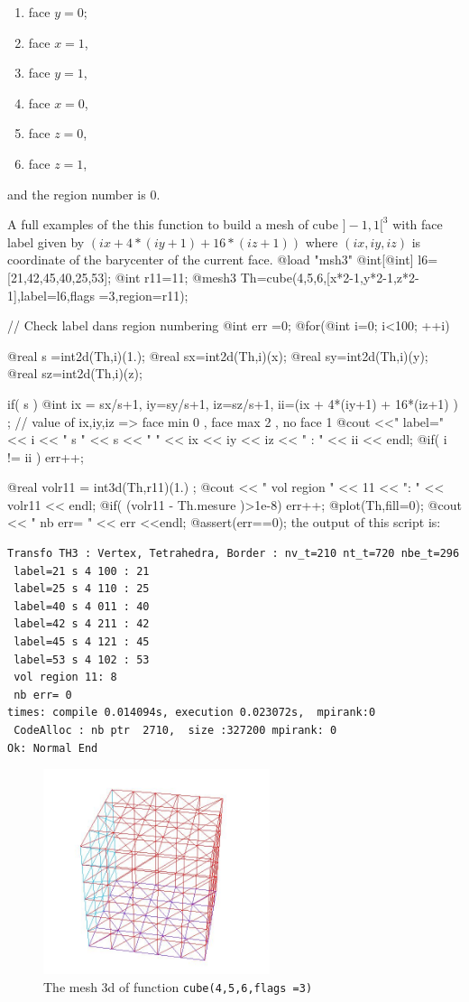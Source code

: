 \documentclass[a4paper,twoside,12pt]{book}
\begin{document}
\begin{enumerate}[topsep=0pt,itemsep=-1ex,partopsep=1ex,parsep=1ex]
 \item face $y=0$; \item  face $x=1$, \item  face $y=1$, \item  face $x=0$, \item   face $z=0$, \item  face $z=1$,
\end{enumerate}
and the region number is $0$. 

A full examples of the this function to build a mesh of cube $]-1,1[^3$ with face label
given by $(ix + 4*(iy+1) + 16*(iz+1) ) $ where $(ix,iy,iz)$ is coordinate of the barycenter of the current face. 
\bFF
@load "msh3"
@int[@int] l6=[21,42,45,40,25,53];
@int r11=11;
@mesh3 Th=cube(4,5,6,[x*2-1,y*2-1,z*2-1],label=l6,flags =3,region=r11); 

// Check label dans  region numbering 
@int err =0; 
@for(@int i=0; i<100; ++i)
{
    @real s =int2d(Th,i)(1.);
    @real sx=int2d(Th,i)(x);
    @real sy=int2d(Th,i)(y);
    @real sz=int2d(Th,i)(z);
    
    if( s )
    {
      @int ix = sx/s+1, iy=sy/s+1, iz=sz/s+1, ii=(ix + 4*(iy+1) + 16*(iz+1) ) ;    
      //  value of ix,iy,iz =>  face min 0 ,  face max 2  , no face 1
      @cout <<" label="<< i << " s " << s << " " << ix << iy << iz << " : " << ii << endl; 
      @if( i != ii ) err++;
    }
}   
@real volr11 = int3d(Th,r11)(1.) ;
@cout << " vol region " << 11 << ": " << volr11 << endl; 
@if( (volr11 - Th.mesure )>1e-8) err++;
@plot(Th,fill=0); 
@cout << " nb err= " << err <<endl;
@assert(err==0); 
\eFF
{}
the output of this script is:
\begin{verbatim}
Transfo TH3 : Vertex, Tetrahedra, Border : nv_t=210 nt_t=720 nbe_t=296
 label=21 s 4 100 : 21
 label=25 s 4 110 : 25
 label=40 s 4 011 : 40
 label=42 s 4 211 : 42
 label=45 s 4 121 : 45
 label=53 s 4 102 : 53
 vol region 11: 8
 nb err= 0
times: compile 0.014094s, execution 0.023072s,  mpirank:0
 CodeAlloc : nb ptr  2710,  size :327200 mpirank: 0
Ok: Normal End
\end{verbatim}

\begin{figure}[htbp]
\begin{center}
  \includegraphics[height=6cm]{func-cube}
\end{center}
  \caption{The mesh 3d  of  function \texttt{cube(4,5,6,flags =3)}
  \label{fig:cube}} 
\end{figure}
\end{document}
